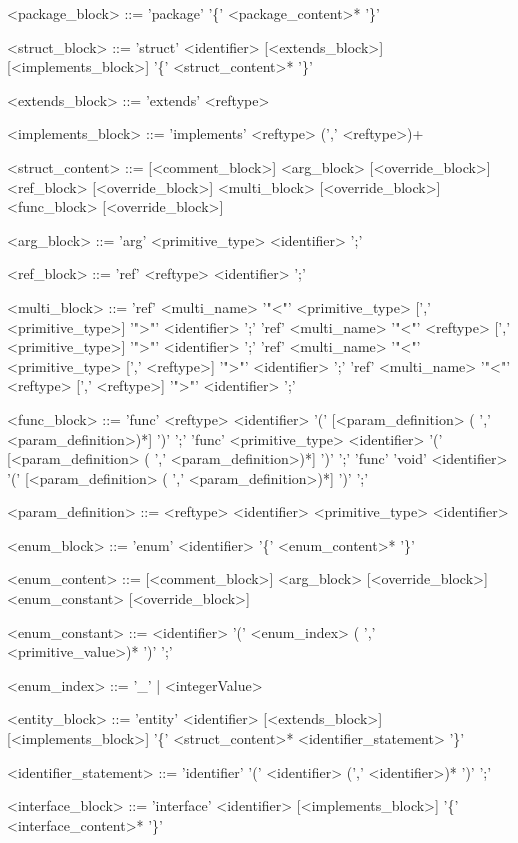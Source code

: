 \documentclass[./einleitung.tex]{subfiles}
\begin{document}
\begin{grammar}
<package_block> ::= 'package' '\{' <package_content>* '\}'

<struct_block> ::= 'struct' <identifier> [<extends_block>] [<implements_block>] '\{' <struct_content>* '\}'


<extends_block> ::= 'extends' <reftype>

<implements_block> ::= 'implements' <reftype> (',' <reftype>)+

<struct_content> ::= [<comment_block>] <arg_block> [<override_block>]
 <ref_block> [<override_block>]
 <multi_block> [<override_block>]
 <func_block> [<override_block>]

<arg_block> ::= 'arg' <primitive_type> <identifier> ';'

<ref_block> ::= 'ref' <reftype> <identifier> ';'

<multi_block> ::= 'ref' <multi_name> '"<"' <primitive_type> [',' <primitive_type>] '">"' <identifier> ';'
\alt 'ref' <multi_name> '"<"' <reftype> [',' <primitive_type>] '">"' <identifier> ';'
\alt 'ref' <multi_name> '"<"' <primitive_type> [',' <reftype>] '">"' <identifier> ';'
\alt 'ref' <multi_name> '"<"' <reftype> [',' <reftype>] '">"' <identifier> ';'

<func_block> ::= 'func' <reftype> <identifier> '(' [<param_definition> ( ',' <param_definition>)*] ')' ';'
\alt 'func' <primitive_type> <identifier> '(' [<param_definition> ( ',' <param_definition>)*] ')' ';'
\alt 'func' 'void' <identifier> '(' [<param_definition> ( ',' <param_definition>)*] ')' ';'

<param_definition> ::= <reftype> <identifier>
\alt <primitive_type> <identifier>

<enum_block> ::= 'enum' <identifier> '\{' <enum_content>* '\}'

<enum_content> ::= [<comment_block>] <arg_block> [<override_block>]
 <enum_constant> [<override_block>]

<enum_constant> ::= <identifier> '(' <enum_index> ( ',' <primitive_value>)* ')' ';'

<enum_index> ::= '_' | <integerValue>

<entity_block> ::= 'entity' <identifier> [<extends_block>] [<implements_block>] '\{' <struct_content>* <identifier_statement> '\}' 

<identifier_statement> ::= 'identifier' '(' <identifier> (',' <identifier>)* ')' ';'

<interface_block> ::= 'interface' <identifier> [<implements_block>] '\{' <interface_content>* '\}'


\end{grammar}
\end{document}
